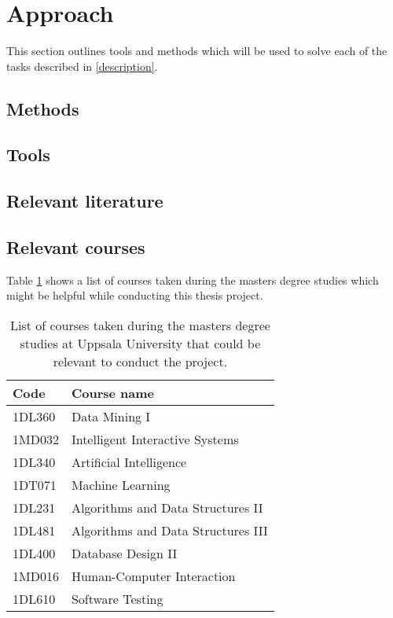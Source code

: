 \section{Approach}

This section outlines tools and methods which will be used to solve each of the tasks described in \ref{description}.

\subsection{Methods}

\subsection{Tools}

\subsection{Relevant literature}

\subsection{Relevant courses}
Table \ref{approach:relevant_courses} shows a list of courses taken during the masters degree studies which might be helpful while conducting this thesis project.

\begin{table}[ht]
  \centering
  \begin{tabularx}{\textwidth}{|l|X|}
    \hline
    Code & Course name \\
    \hline
    1DL360 & Data Mining I \\
    1MD032 & Intelligent Interactive Systems \\
    1DL340 & Artificial Intelligence \\
    1DT071 & Machine Learning \\
    1DL231 & Algorithms and Data Structures II \\
    1DL481 & Algorithms and Data Structures III \\
    1DL400 & Database Design II \\
    1MD016 & Human-Computer Interaction \\
    1DL610 & Software Testing \\
    \hline
  \end{tabularx}
  \caption{List of courses taken during the masters degree studies at Uppsala University that could be relevant to conduct the project.}
  \label{approach:relevant_courses}
\end{table}